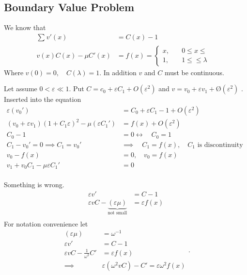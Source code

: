 \documentclass{article}
\theoremstyle{remark}
\newcommand{\newpara}
  {
  \vskip 0.4cm
  }
\begin{document}
\subsection{Boundary Value Problem}%
\label{sub:boundary_value_problem}

We know that \[
  \begin{split}
\sum_{}^{} v' \left( x \right)  & = C\left( x \right) - 1 \\
v\left( x \right)C\left( x \right) - \mu  C' \left( x \right)  & = f\left( x \right) = \begin{cases}
  x,  &  \quad  0 \le x \le \\
  1,  &  \quad  1 \le \le \lambda   
\end{cases}
 &   \end{split} 
\] 
Where  $v\left( 0 \right) = 0, \quad    C\left( \lambda  \right)  =1 $.
In addition $v$ and $C$ must be continuous. 

\newpara
Let assume $ 0 < \varepsilon  \ll  1$. Put $C = c_{0} + \varepsilon  C_{1} + O\left( \varepsilon ^2 \right)$ and $v = v_{0} + \varepsilon  v_{1} + Ø\left( \varepsilon ^2 \right)$ . Inserted into the equation \[
  \begin{split}
\varepsilon \left( v_{0}'   \right) &=  C_{0} + \varepsilon C_{1} - 1 + O\left( \varepsilon ^2 \right)  \\
\left( v_{0} + \varepsilon  v_{1} \right) \left( 1 + C_{1} \varepsilon  \right) ^2 - \mu \left(  \varepsilon  C_{1}'    \right)  &  = f\left( x \right) + O\left( \varepsilon ^2 \right)   \\
C_{0} - 1 &=  0 \leftrightarrow  \quad  C_{0} = 1  \\
C_{1} - v_{0}'  =  0  \implies  C_{1} = v_{0}'    & \implies \quad C_{1} = f\left( x \right) , \quad C_{1}\text{ is discontinuity }    \\
v_{0} - f\left( x \right) &=  0, \quad v_{0} = f\left( x \right)   \\
v_{1} + v_{0} C_{1} - \mu \varepsilon C_{1}'  &=  0 \\
  \end{split} 
\] 

Something is wrong. 
\[
\begin{split}
  \varepsilon  v'  &=  C- 1 \\
  \varepsilon  v C - \underbrace{\left( \varepsilon  \mu  \right)}_{ \text{not small} }  &=  \varepsilon f\left( x \right) \\
\end{split} 
\] 
For notation convenience let \[
\begin{split}
  \left( \varepsilon  \mu  \right) &= \omega ^{-1}   \\
  \varepsilon v'  &=  C - 1 \\
  \varepsilon vC - \frac{1}{\omega ^{2}} C'  &=  \varepsilon  f\left( x \right) \\
  \implies   &  \varepsilon \left( \omega ^2 v C \right) - C'  = \varepsilon  \omega ^2 f\left( x \right)
\end{split} .
\] 
\end{document}
